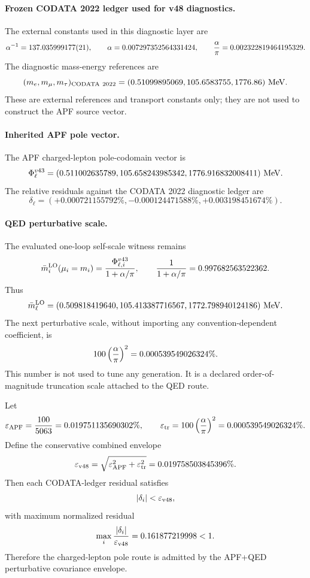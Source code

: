 \paragraph{Frozen CODATA 2022 ledger used for v48 diagnostics.}
The external constants used in this diagnostic layer are
\[
\alpha^{-1}=137.035999177(21),
\qquad
\alpha=0.007297352564331424,
\qquad
{\alpha\over\pi}=0.002322819464195329.
\]
The diagnostic mass-energy references are
\[
(m_e,m_\mu,m_\tau)_{\rm CODATA\ 2022}
=(0.51099895069,105.6583755,1776.86)\ {\rm MeV}.
\]
These are external references and transport constants only; they are not used to construct the APF source vector.

\paragraph{Inherited APF pole vector.}
The APF charged-lepton pole-codomain vector is
\[
\Phi_\ell^{v43}
=(0.511002635789,105.658243985342,1776.916832008411)\ {\rm MeV}.
\]
The relative residuals against the CODATA 2022 diagnostic ledger are
\[
\delta_\ell
=(+0.000721155792\%,-0.000124471588\%,+0.003198451674\%).
\]

\paragraph{QED perturbative scale.}
The evaluated one-loop self-scale witness remains
\[
\bar m_i^{\rm LO}(\mu_i=m_i)
={\Phi_{\ell,i}^{v43}\over 1+\alpha/\pi},
\qquad
{1\over 1+\alpha/\pi}=0.997682563522362.
\]
Thus
\[
\bar m_\ell^{\rm LO}
=(0.509818419640,105.413387716567,1772.798940124186)\ {\rm MeV}.
\]
The next perturbative scale, without importing any convention-dependent coefficient, is
\[
100\left({\alpha\over\pi}\right)^2
=0.000539549026324\%.
\]
This number is not used to tune any generation. It is a declared order-of-magnitude truncation scale attached to the QED route.

\begin{theorem}
Let
\[
\varepsilon_{\rm APF}={100\over5063}=0.019751135690302\%,
\qquad
\varepsilon_{\rm tr}=100\left({\alpha\over\pi}\right)^2=0.000539549026324\%.
\]
Define the conservative combined envelope
\[
\varepsilon_{\rm v48}
=\sqrt{\varepsilon_{\rm APF}^2+\varepsilon_{\rm tr}^2}
=0.019758503845396\%.
\]
Then each CODATA-ledger residual satisfies
\[
|\delta_i|<\varepsilon_{\rm v48},
\]
with maximum normalized residual
\[
\max_i {|\delta_i|\over\varepsilon_{\rm v48}}
=0.161877219998<1.
\]
Therefore the charged-lepton pole route is admitted by the APF+QED perturbative covariance envelope.
\end{theorem}

